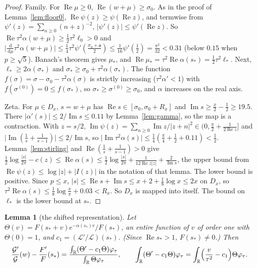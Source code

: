 \documentclass[11pt]{article}
\newtheorem{lemma}[theorem]{Lemma}
\theoremstyle{definition}
\theoremstyle{remark}
\newcommand{\R}{\mathbb R}
\newcommand{\dd}{\,\mathrm d}
\newcommand{\cG}{\mathcal G}
\newcommand{\cL}{\mathcal L}
\newcommand{\fa}{\mathfrak a}
\newcommand{\re}{\operatorname{Re}}
\newcommand{\im}{\operatorname{Im}}
\numberwithin{equation}{section}
\begin{document}
\begin{proof}
Family. For $\re\mu\ge0$, $\re(w+\mu)\ge\sigma_0$. As in the proof of
Lemma~\ref{lem:floor0}, $\re\psi(z)\ge\psi(\re z)$, and termwise from
$\psi'(z)=\sum_{n\ge0}(n+z)^{-2}$, $\lvert\psi'(z)\rvert\le\psi'(\re z)$.
So $\re\tau^2\alpha(w+\mu)\ge\frac12\tau^2\ell_0>0$ and
$\bigl\lvert\frac{\dd}{\dd\mu}\tau^2\alpha(w+\mu)\bigr\rvert\le\frac14\tau^2\psi'(\frac{\sigma_0+\fa}2)\le\frac1{16}\psi'(\frac12)=\frac{\pi^2}{32}<0.31$
(below $0.15$ when $p\ge\sqrt5$). Banach's theorem gives $\mu_*$, and
$\re\mu_*=\tau^2\re\alpha(s_*)=\frac12\tau^2\ell_*$. Next,
$\ell_*\ge2\alpha(\sigma_*)$ and $\sigma_*\ge\sigma_0+\tau^2\alpha(\sigma_*)$.
The function $f(\sigma)=\sigma-\sigma_0-\tau^2\alpha(\sigma)$ is strictly
increasing ($\tau^2\alpha'<1$) with $f(\sigma^{(0)})=0\le f(\sigma_*)$, so
$\sigma_*\ge\sigma^{(0)}\ge\sigma_0$, and $\alpha$ increases on the real
axis.

Zeta. For $\mu\in D_x$, $s=w+\mu$ has $\re s\in[\sigma_0,\sigma_0+R_x]$ and
$\im s\ge\frac x2-\frac12\ge19.5$. There $\lvert\alpha'(s)\rvert\le2/\im s\le0.11$
by Lemma~\ref{lem:gamma}, so the map is a contraction. With $z=s/2$,
$\im\psi(z)=\sum_{n\ge0}\im z/\lvert z+n\rvert^2\in(0,\frac\pi2+\frac1{2\re z}]$
and $\lvert\im(\frac1s+\frac1{s-1})\rvert\le2/\im s$, so
$\lvert\im\tau^2\alpha(s)\rvert\le\frac14(\frac\pi4+\frac12+0.11)<\frac12$.
Lemma~\ref{lem:stirling} and $\re(\frac1s+\frac1{s-1})>0$ give
$\frac12\log\frac{\lvert s\rvert}{2\pi}-c(z)\le\re\alpha(s)\le\frac12\log\frac{\lvert s\rvert}{2\pi}+\frac1{12\re z\lvert z\rvert}+\frac2{\im s}$,
the upper bound from $\re\psi(z)\le\log\lvert z\rvert+\lvert I(z)\rvert$ in
the notation of that lemma. The lower bound is positive. Since $p\le x$,
$\lvert s\rvert\le\re s+\im s\le x+2+\frac18\log x\le2x$ on $D_x$, so
$\tau^2\re\alpha(s)\le\frac18\log\frac x\pi+0.03<R_x$. So $D_x$ is
mapped into itself. The bound on $\ell_*$ is the lower bound at $s_*$.
\end{proof}

\begin{lemma}[the shifted representation]\label{lem:shift}
Let $\Theta(v)=F(s_*+v)e^{-\alpha(s_*)v}/F(s_*)$, an entire function of $v$
of order one with $\Theta(0)=1$, and $c_1=(\cL'/\cL)(s_*)$. (Since
$\re s_*>1$, $F(s_*)\ne0$.) Then
\[
\frac{\cG'}{\cG}(w)-\frac{F'}{F}(s_*)=\frac{\int_\R(\Theta'-c_1\Theta)\varphi_\tau}{\int_\R\Theta\varphi_\tau},\qquad
\int_\R(\Theta'-c_1\Theta)\varphi_\tau=\int_\R\Bigl(\frac v{\tau^2}-c_1\Bigr)\Theta\varphi_\tau .
\]
\end{lemma}
\end{document}
